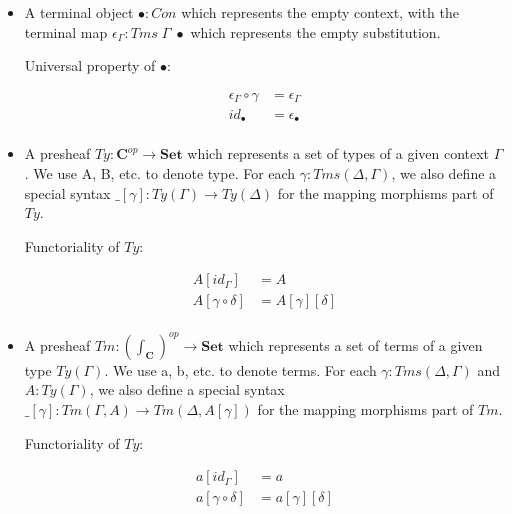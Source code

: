 {\begin{itemize}
{  Categorical rules for \textbf{C}:

  \begin{align*}
    id_{\Gamma} \circ \gamma & = \gamma \\
    \gamma \circ id_{\Gamma} & = \gamma \\
    (\gamma \circ \delta) \circ \theta & = \gamma \circ (\delta \circ \theta) \\
  \end{align*}
  }

  \item{A terminal object $\bullet : Con$ which represents the empty context, with the terminal map $\epsilon_{\Gamma} : Tms\;\Gamma\;\bullet$ which represents the empty substitution. 
  
  Universal property of $\bullet$:

  \begin{align*}
    \epsilon_{\Gamma} \circ \gamma & = \epsilon_{\Gamma} \\
    id_{\bullet} & = \epsilon_{\bullet} \\
  \end{align*}
  }

  \item{A presheaf $Ty : \textbf{C}^{op} \to \textbf{Set}$ which represents a set of types of a given context $\Gamma$. We use A, B, etc. to denote type. For each $\gamma : Tms (\Delta, \Gamma)$, we also define a special syntax $\_[\gamma] : Ty(\Gamma) \to Ty(\Delta)$ for the mapping morphisms part of $Ty$.

  Functoriality of $Ty$:

  \begin{align*}
    A [id_{\Gamma}] & = A \\
    A [\gamma \circ \delta] & = A [\gamma] [\delta] \\
  \end{align*}
  }

  \item{A presheaf 
  $Tm : (\int_{\textbf{C}})^{op} \to \textbf{Set}$ 
  which represents a set of terms of a given type $Ty(\Gamma)$. We use a, b, etc. to denote terms. For each $\gamma : Tms (\Delta, \Gamma)$ and $A : Ty(\Gamma)$, we also define a special syntax $\_[\gamma] : Tm(\Gamma, A) \to Tm(\Delta, A [\gamma])$ for the mapping morphisms part of $Tm$.

  Functoriality of $Ty$:

  \begin{align*}
    a [id_{\Gamma}] & = a \\
    a [\gamma \circ \delta] & = a [\gamma] [\delta] \\
  \end{align*}
  }


\end{itemize}}
